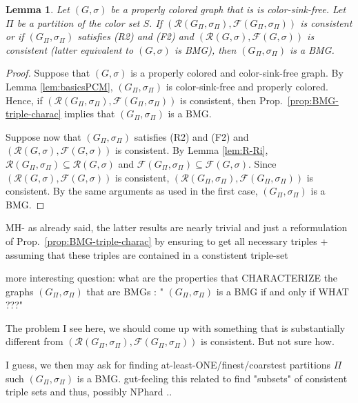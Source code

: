 \documentclass[final,3p,times]{elsarticle}
\newtheorem{lemma}[theorem]{Lemma}%
\newcommand{\TODO}[1]{\begingroup\color{red}#1\endgroup}
\begin{document}
\begin{lemma}
    Let $(G,\sigma)$ be a properly colored graph that is is color-sink-free. Let
    $\Pi$ be a partition of the color set $S$. If 
    $(\mathscr{R}(G_\Pi,\sigma_\Pi),
    \mathscr{F}(G_\Pi,\sigma_\Pi))$ is consistent or if 
    $(G_\Pi,\sigma_\Pi)$ 
    satisfies (R2) and (F2) and $(\mathscr{R}(G,\sigma),
    \mathscr{F}(G,\sigma))$ is consistent (latter equivalent to $(G,\sigma)$  is BMG), 
    then $(G_\Pi,\sigma_\Pi)$ is a BMG. 
\end{lemma}
\begin{proof}
    Suppose that $(G,\sigma)$ is a properly colored and color-sink-free graph.
   By Lemma \ref{lem:basicsPCM}, $(G_\Pi,\sigma_\Pi)$ is color-sink-free and
   properly colored. Hence, if $(\mathscr{R}(G_\Pi,\sigma_\Pi),
   \mathscr{F}(G_\Pi,\sigma_\Pi))$ is consistent, then Prop.\
   \ref{prop:BMG-triple-charac} implies that $(G_\Pi,\sigma_\Pi)$ is a BMG. 
     
    Suppose now that $(G_\Pi,\sigma_\Pi)$ satisfies (R2) and (F2) and
    $(\mathscr{R}(G,\sigma), \mathscr{F}(G,\sigma))$ is consistent. By Lemma
    \ref{lem:R-Ri}, $\mathscr{R}(G_\Pi,\sigma_\Pi) \subseteq
    \mathscr{R}(G,\sigma)$ and $\mathscr{F}(G_\Pi,\sigma_\Pi) \subseteq
    \mathscr{F}(G,\sigma)$. Since $(\mathscr{R}(G,\sigma),
    \mathscr{F}(G,\sigma))$ is consistent, $(\mathscr{R}(G_\Pi,\sigma_\Pi)
    ,\mathscr{F}(G_\Pi,\sigma_\Pi) )$ is consistent. By the same arguments as
    used in the first case, $(G_\Pi,\sigma_\Pi)$ is a BMG. 
\end{proof}


\TODO{MH- as already said, the latter results are nearly trivial and just a 
	reformulation of  Prop.\   \ref{prop:BMG-triple-charac} by ensuring
	to get all necessary triples +  assuming that these triples are 
	contained in a constistent triple-set

more interesting question: what are the properties that CHARACTERIZE the graphs $(G_\Pi,\sigma_\Pi)$ that are BMGs :
	"	 $(G_\Pi,\sigma_\Pi)$ is a BMG if and	only if   WHAT ???"	
	
	The problem I see here, we should come up with something that is substantially
	different from $(\mathscr{R}(G_\Pi,\sigma_\Pi) ,\mathscr{F}(G_\Pi,\sigma_\Pi) )$ is consistent.
	But not sure how. 
	
	I guess, we then may ask for finding at-least-ONE/finest/coarstest partitions $\Pi$ such 
	$(G_\Pi,\sigma_\Pi)$ is a BMG. gut-feeling this related to 
	find "subsets" of consistent triple sets and thus, possibly NPhard .. 
 }
 
\end{document}
